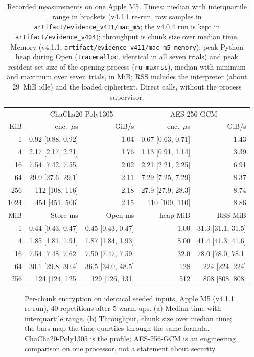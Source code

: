 \documentclass[pdflatex,sn-mathphys-num,twocolumn]{sn-jnl}
\theoremstyle{plain}
\theoremstyle{definition}
\newcommand{\code}[1]{\texttt{#1}}
\begin{document}
\begin{table}[t]
\caption{Recorded measurements on one Apple M5. Times: median with interquartile range in brackets (v4.1.1 re-run, raw samples in \code{artifact/evidence\_v411/mac\_m5}; the v4.0.4 run is kept in \code{artifact/evidence\_v404}); throughput is chunk size over median time. Memory (v4.1.1, \code{artifact/evidence\_v411/mac\_m5\_memory}): peak Python heap during Open (\code{tracemalloc}, identical in all seven trials) and peak resident set size of the opening process (\code{ru\_maxrss}), median with minimum and maximum over seven trials, in MiB; RSS includes the interpreter (about 29~MiB idle) and the loaded ciphertext. Direct calls, without the process supervisor.}\label{tab:bench}
\centering\footnotesize
\begin{tabular}{@{}rrrrr@{}}\toprule
& \multicolumn{2}{c}{ChaCha20-Poly1305} & \multicolumn{2}{c}{AES-256-GCM}\\
KiB & enc.\ $\mu$s & GiB/s & enc.\ $\mu$s & GiB/s\\\midrule
1 & 0.92 [0.88, 0.92] & 1.04 & 0.67 [0.63, 0.71] & 1.43\\
4 & 2.17 [2.17, 2.21] & 1.76 & 1.13 [0.91, 1.14] & 3.39\\
16 & 7.54 [7.42, 7.55] & 2.02 & 2.21 [2.21, 2.25] & 6.91\\
64 & 29.0 [27.6, 29.1] & 2.11 & 7.29 [7.25, 7.29] & 8.37\\
256 & 112 [108, 116] & 2.18 & 27.9 [27.9, 28.3] & 8.74\\
1024 & 454 [451, 506] & 2.15 & 110 [109, 110] & 8.86\\\midrule
MiB & Store ms & Open ms & heap MiB & RSS MiB\\\midrule
1 & 0.44 [0.43, 0.47] & 0.45 [0.43, 0.47] & 1.00 & 31.3 [31.1, 31.5]\\
4 & 1.85 [1.81, 1.91] & 1.87 [1.84, 1.93] & 8.00 & 41.4 [41.3, 41.6]\\
16 & 7.54 [7.48, 7.62] & 7.50 [7.47, 7.59] & 32.0 & 78.0 [78.0, 78.1]\\
64 & 30.1 [29.8, 30.4] & 36.5 [34.0, 48.5] & 128 & 224 [224, 224]\\
256 & 124 [124, 125] & 129 [126, 131] & 512 & 808 [808, 808]\\\bottomrule
\end{tabular}
\end{table}

\begin{figure}[t]
\centering

\caption{Per-chunk encryption on identical seeded inputs, Apple M5 (v4.1.1 re-run), 40 repetitions after 5 warm-ups. (a) Median time with interquartile range. (b) Throughput, chunk size over median time; the bars map the time quartiles through the same formula. ChaCha20-Poly1305 is the profile; AES-256-GCM is an engineering comparison on one processor, not a statement about security.}\label{fig:latency}
\end{figure}
\end{document}
